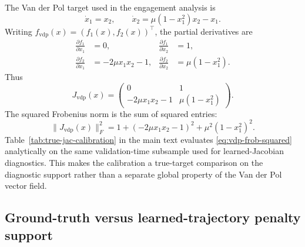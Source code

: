 The Van der Pol target used in the engagement analysis is
\begin{equation}
\dot{x}_1 = x_2,
\qquad
\dot{x}_2 = \mu(1-x_1^2)x_2 - x_1.
\end{equation}
Writing $f_\mathrm{vdp}(x) = (f_1(x), f_2(x))^\top$, the partial derivatives are
\begin{align}
\frac{\partial f_1}{\partial x_1} &= 0,
&
\frac{\partial f_1}{\partial x_2} &= 1, \\
\frac{\partial f_2}{\partial x_1} &= -2\mu x_1 x_2 - 1,
&
\frac{\partial f_2}{\partial x_2} &= \mu(1-x_1^2).
\end{align}
Thus
\begin{equation}
J_{\mathrm{vdp}}(x)
=
\begin{pmatrix}
0 & 1 \\
-2\mu x_1x_2 - 1 & \mu(1-x_1^2)
\end{pmatrix}.
\label{eq:vdp-jacobian}
\end{equation}
The squared Frobenius norm is the sum of squared entries:
\begin{equation}
\|J_{\mathrm{vdp}}(x)\|_F^2
=
1 + (-2\mu x_1x_2 - 1)^2 + \mu^2(1-x_1^2)^2.
\label{eq:vdp-frob-squared}
\end{equation}
Table~\ref{tab:true-jac-calibration} in the main text evaluates
\eqref{eq:vdp-frob-squared} analytically on the same validation-time subsample
used for learned-Jacobian diagnostics. This makes the calibration a
true-target comparison on the diagnostic support rather than a separate global
property of the Van der Pol vector field.

\subsection{Ground-truth versus learned-trajectory penalty support}
\label{app:penalty-mismatch}

